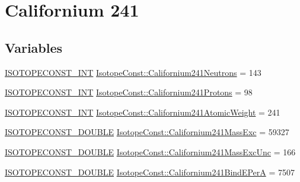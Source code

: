 \hypertarget{group___isotope_const-_californium-_cf241}{}\section{Californium 241}
\label{group___isotope_const-_californium-_cf241}
\subsection*{Variables}
\begin{DoxyCompactItemize}
\item 
\mbox{\hyperlink{group___isotope_const-_macros_ga5f18360b3e99483a35c32d789e62621c}{I\+S\+O\+T\+O\+P\+E\+C\+O\+N\+S\+T\+\_\+\+I\+NT}} \mbox{\hyperlink{group___isotope_const-_californium-_cf241_gaf7bb500a7111375e19ae5d41c76e6c42}{Isotope\+Const\+::\+Californium241\+Neutrons}} = 143
\item 
\mbox{\hyperlink{group___isotope_const-_macros_ga5f18360b3e99483a35c32d789e62621c}{I\+S\+O\+T\+O\+P\+E\+C\+O\+N\+S\+T\+\_\+\+I\+NT}} \mbox{\hyperlink{group___isotope_const-_californium-_cf241_gaff6af556f9d686ceba9e0fe3877ccd7b}{Isotope\+Const\+::\+Californium241\+Protons}} = 98
\item 
\mbox{\hyperlink{group___isotope_const-_macros_ga5f18360b3e99483a35c32d789e62621c}{I\+S\+O\+T\+O\+P\+E\+C\+O\+N\+S\+T\+\_\+\+I\+NT}} \mbox{\hyperlink{group___isotope_const-_californium-_cf241_ga47f9ea4a0a75bd4733336ca283887ca6}{Isotope\+Const\+::\+Californium241\+Atomic\+Weight}} = 241
\item 
\mbox{\hyperlink{group___isotope_const-_macros_ga8f45a7272ce02c0b4c65c44636ed719a}{I\+S\+O\+T\+O\+P\+E\+C\+O\+N\+S\+T\+\_\+\+D\+O\+U\+B\+LE}} \mbox{\hyperlink{group___isotope_const-_californium-_cf241_gaac9a15941130472b9dff20502372eb86}{Isotope\+Const\+::\+Californium241\+Mass\+Exc}} = 59327
\item 
\mbox{\hyperlink{group___isotope_const-_macros_ga8f45a7272ce02c0b4c65c44636ed719a}{I\+S\+O\+T\+O\+P\+E\+C\+O\+N\+S\+T\+\_\+\+D\+O\+U\+B\+LE}} \mbox{\hyperlink{group___isotope_const-_californium-_cf241_ga6160424ee5bba4e89b0472ff0f0e6eb4}{Isotope\+Const\+::\+Californium241\+Mass\+Exc\+Unc}} = 166
\item 
\mbox{\hyperlink{group___isotope_const-_macros_ga8f45a7272ce02c0b4c65c44636ed719a}{I\+S\+O\+T\+O\+P\+E\+C\+O\+N\+S\+T\+\_\+\+D\+O\+U\+B\+LE}} \mbox{\hyperlink{group___isotope_const-_californium-_cf241_ga28d951e7e494322ff667ff38aab40237}{Isotope\+Const\+::\+Californium241\+Bind\+E\+PerA}} = 7507
\item 

\end{DoxyCompactItemize}
